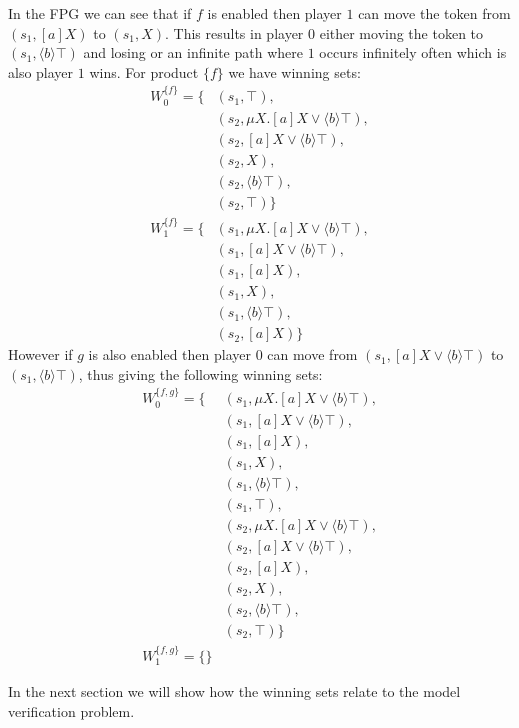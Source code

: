 In the FPG we can see that if $f$ is enabled then player $1$ can move the token from $(s_1, [a]X)$ to $(s_1,X)$. This results in player $0$ either moving the token to $(s_1, \langle b \rangle \top)$ and losing or an infinite path where $1$ occurs infinitely often which is also player $1$ wins. For product $\{f\}$ we have winning sets:
\begin{align*}
W_0^{\{f\}} = \{
& (s_1, \top),\\
& (s_2, \mu X.[a]X \vee \langle b \rangle \top),\\
& (s_2, [a]X \vee \langle b \rangle \top),\\
& (s_2, X),\\
& (s_2, \langle b \rangle \top),\\
& (s_2, \top)
\}\\
W_1^{\{f\}} = \{& (s_1, \mu X.[a]X \vee \langle b \rangle \top),\\
& (s_1, [a]X \vee \langle b \rangle \top),\\
& (s_1, [a]X),\\
& (s_1, X),\\
& (s_1, \langle b \rangle \top ),\\
& (s_2, [a]X)\}
\end{align*}
However if $g$ is also enabled then player $0$ can move from $(s_1, [a]X \vee \langle b \rangle \top)$ to $(s_1, \langle b \rangle \top)$, thus giving the following winning sets:
\begin{align*}
W_0^{\{f,g\}} = \{& (s_1, \mu X.[a]X \vee \langle b \rangle \top),\\
& (s_1, [a]X \vee \langle b \rangle \top),\\
& (s_1, [a]X),\\
& (s_1, X),\\
& (s_1, \langle b \rangle \top ),\\
& (s_1, \top),\\
& (s_2, \mu X.[a]X \vee \langle b \rangle \top),\\
& (s_2, [a]X \vee \langle b \rangle \top),\\
& (s_2, [a]X),\\
& (s_2, X),\\
& (s_2, \langle b \rangle \top),\\
& (s_2, \top)
\}\\
W_1^{\{f,g\}} = \{\}
\end{align*}

In the next section we will show how the winning sets relate to the model verification problem.


